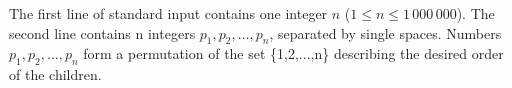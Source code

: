 The first line of standard input contains one integer $n$ ($1 \le n \le 1\,000\,000$). The second line contains n integers
$p_1, p_2, \ldots , p_n$, separated by single spaces. Numbers $p_1, p_2, \ldots , p_n$ form a permutation of the set \{1,2,...,n\}
describing the desired order of the children.
